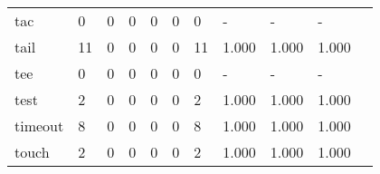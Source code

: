 \begin{longtable}{lp{1.2cm}p{1.2cm}p{1.2cm}p{1.2cm}p{1.2cm}p{1.2cm}p{1.2cm}p{1.2cm}p{1.2cm}p{1.2cm}}
tac       &                                     0 &                                                  0 &                                                  0 &                                                  0 &                                                  0 &                                                  0 &                                                  - &                                                  - &                                                  - \\
tail      &                                    11 &                                                  0 &                                                  0 &                                                  0 &                                                  0 &                                                 11 &                                              1.000 &                                              1.000 &                                              1.000 \\
tee       &                                     0 &                                                  0 &                                                  0 &                                                  0 &                                                  0 &                                                  0 &                                                  - &                                                  - &                                                  - \\
test      &                                     2 &                                                  0 &                                                  0 &                                                  0 &                                                  0 &                                                  2 &                                              1.000 &                                              1.000 &                                              1.000 \\
timeout   &                                     8 &                                                  0 &                                                  0 &                                                  0 &                                                  0 &                                                  8 &                                              1.000 &                                              1.000 &                                              1.000 \\
touch     &                                     2 &                                                  0 &                                                  0 &                                                  0 &                                                  0 &                                                  2 &                                              1.000 &                                              1.000 &                                              1.000 \\

\end{longtable}
